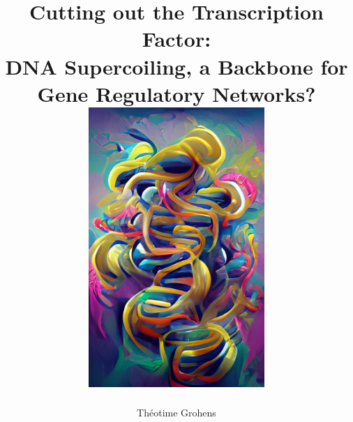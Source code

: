 \documentclass[a4paper,twoside,12pt]{memoir}
\begin{document}
\author{Théotime Grohens}
\title{Cutting out the Transcription Factor: \\
DNA Supercoiling, a Backbone for \\
Gene Regulatory Networks?\vspace{1cm} \\
\includegraphics[width=0.5\textwidth]{art.pdf}}


\maketitle
\thispagestyle{empty}
\pagebreak

\frontmatter

\setcounter{page}{1}  %



\tableofcontents
\listoffigures
\listoftables

\mainmatter










\appendix




\backmatter



\end{document}
